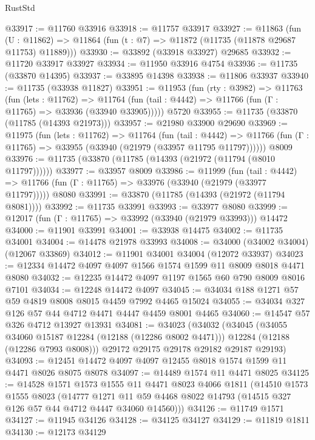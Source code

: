 \begin{lexlean}{RustStd}
\begin{coremodule}
@33917 := @11760 @33916
@33918 := @11757 @33917
@33927 := @11863
    (fun (U : @11862) => @11864 (fun (t : @7) => @11872 (@11735 (@11878 @29687 @11753) @11889)))
@33930 := @33892 (@33918 @33927) @29685
@33932 := @11720 @33917 @33927
@33934 := @11950 @33916 @4754
@33936 := @11735 (@33870 @14395)
@33937 := @33895 @14398
@33938 := @11806 @33937
@33940 := @11735 (@33938 @11827)
@33951 := @11953
    (fun (rty : @3982) =>
    @11763
      (fun (lets : @11762) =>
      @11764 (fun (tail : @4442) => @11766 (fun (Γ : @11765) => @33936 (@33940 @33905)))))
    @5720
@33955 := @11735 (@33870 (@11785 (@14393 @21973)))
@33957 := @21980 @33900 @29690
@33969 := @11975
    (fun (lets : @11762) =>
    @11764
      (fun (tail : @4442) =>
      @11766 (fun (Γ : @11765) => @33955 (@33940 (@21979 (@33957 @11795 @11797))))))
    @8009
@33976 := @11735 (@33870 (@11785 (@14393 (@21972 (@11794 (@8010 @11797))))))
@33977 := @33957 @8009
@33986 := @11999
    (fun (tail : @4442) => @11766 (fun (Γ : @11765) => @33976 (@33940 (@21979 (@33977 @11797)))))
    @8080
@33991 := @33870 (@11785 (@14393 (@21972 (@11794 @8081))))
@33992 := @11735 @33991
@33993 := @33977 @8080
@33999 := @12017 (fun (Γ : @11765) => @33992 (@33940 (@21979 @33993))) @14472
@34000 := @11901 @33991
@34001 := @33938 @14475
@34002 := @11735 @34001
@34004 := @14478 @21978 @33993
@34008 := @34000 (@34002 @34004) (@12067 @33869)
@34012 := @11901 @34001 @34004 (@12072 @33937)
@34023 := @12334 @14472 @4097 @4097 @1566 @1574 @1599 @11 @8009 @8018 @4471 @8080
@34032 := @12235 @14472 @4097 @1197 @1565 @60 @790 @8009 @8016 @7101
@34034 := @12248 @14472 @4097
@34045 := @34034 @188 @1271 @57 @59 @4819 @8008 @8015 @4459 @7992 @4465 @15024
@34055 := @34034 @327 @126 @57 @44 @4712 @4471 @4447 @4459 @8001 @4465
@34060 := @14547 @57 @326 @4712 @13927 @13931
@34081 := @34023
    (@34032
      (@34045
        (@34055 @34060 @15187 @12284 (@12188 (@12286 @8002 @4471)))
        @12284
        (@12188 (@12286 @7993 @8008)))
      @29172
      @29175
      @29178
      @29182
      @29187
      @29193)
@34093 := @12451 @14472 @4097 @4097 @12455 @8018 @1574 @1599 @11 @4471 @8026 @8075 @8078
@34097 := @14489 @1574 @11 @4471 @8025
@34125 := @14528
    @1571
    @1573
    @1555
    @11
    @4471
    @8023
    @4066
    @1811
    (@14510
      @1573
      @1555
      @8023
      (@14777
        @1271
        @11
        @59
        @4468
        @8022
        @14793
        (@14515 @327 @126 @57 @44 @4712 @4447 @34060 @14560)))
@34126 := @11749 @1571
@34127 := @11945 @34126
@34128 := @34125 @34127
@34129 := @11819 @1811
@34130 := @12173 @34129

\end{coremodule}
\end{lexlean}
